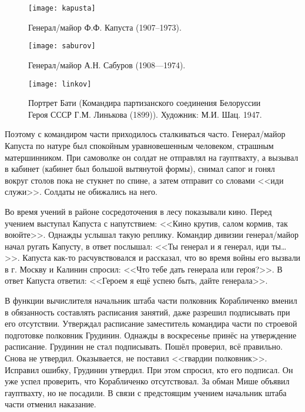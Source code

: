 \begin{figure}[h]
	\centering
	
	\begin{minipage}[h]{0.3\textwidth}			
		\texttt{[image: kapusta]}
		\caption{Генерал\-/майор Ф.Ф. Капуста (1907--1973).}
		\label{fig:kapusta}		
	\end{minipage}	
	\hfill
	\begin{minipage}[h]{0.3\textwidth}			
		\texttt{[image: saburov]}
		\caption{Генерал\-/майор А.Н. Сабуров (1908—1974).}
		\label{fig:saburov}
	\end{minipage}
	\hfill
	\begin{minipage}[h]{0.3\textwidth}		
		\texttt{[image: linkov]}
		\caption{Портрет Бати (Командира партизанского соединения Белоруссии Героя СССР Г.М. Линькова (1899)). Художник: М.И. Шац. 1947.}
		\label{fig:linkov}
	\end{minipage}
\end{figure}

Поэтому с командиром части приходилось сталкиваться часто. Генерал\-/майор Капуста по натуре был спокойным уравновешенным человеком, страшным матершинником. При самоволке он солдат не отправлял на гауптвахту, а вызывал в кабинет (кабинет был большой вытянутой формы), снимал сапог и гонял вокруг столов пока не стукнет по спине, а затем отправит со словами <<иди служи>>. Солдаты не обижались на него.

Во время учений в районе сосредоточения в лесу показывали кино. Перед учением выступал Капуста с напутствием: <<Кино крутив, салом кормив, так воюйте>>. Однажды услышал такую реплику. Командир дивизии генерал\-/майор начал ругать Капусту, в ответ послышал: <<Ты генерал и я генерал, иди ты…>>. Капуста как-то расчувствовался и рассказал, что во время войны его вызвали в г. Москву и Калинин спросил: <<Что тебе дать генерала или героя?>>. В ответ Капуста ответил: <<Героем я ещё успею быть, дайте генерала>>. 

В функции вычислителя начальник штаба части полковник Корабличенко вменил в обязанность составлять расписания занятий, даже разрешил подписывать при его отсутствии. Утверждал расписание заместитель командира части по строевой подготовке полковник Грудинин. Однажды в воскресенье принёс на утверждение расписание. Грудинин не стал подписывать. Пошёл проверил, всё правильно. Снова не утвердил. Оказывается, не поставил <<гвардии полковник>>. Исправил ошибку, Грудинин утвердил. При этом спросил, кто его подписал. Он уже успел проверить, что Корабличенко отсутствовал. За обман Мише объявил гауптвахту, но не посадили. В связи с предстоящим учением начальник штаба части отменил наказание.

